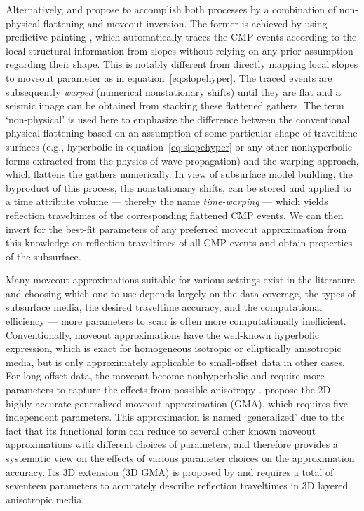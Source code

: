 Alternatively, \cite{will} and \cite{willthesis} propose to accomplish both processes by a combination of non-physical flattening and moveout inversion. The former is achieved by using predictive painting \cite[]{fomelpredict}, which automatically traces the CMP events according to the local structural information from slopes without relying on any prior assumption regarding their shape. This is notably different from directly mapping local slopes to moveout parameter as in equation~\ref{eq:slopehyper}. The traced events are subsequently \textit{warped} (numerical nonstationary shifts) until they are flat and a seismic image can be obtained from stacking these flattened gathers. The term `non-physical' is used here to emphasize the difference between the conventional physical flattening based on an assumption of some particular shape of traveltime surfaces (e.g., hyperbolic in equation~\ref{eq:slopehyper} or any other nonhyperbolic forms extracted from the physics of wave propagation) and the warping approach, which flattens the gathers numerically. In view of subsurface model building, the byproduct of this process, the nonstationary shifts, can be stored and applied to a time attribute volume --- thereby the name \textit{time-warping} --- which yields reflection traveltimes of the corresponding flattened CMP events. We can then invert for the best-fit parameters of any preferred moveout approximation from this knowledge on reflection traveltimes of all CMP events and obtain properties of the subsurface.


Many moveout approximations suitable for various settings exist in the literature and choosing which one to use depends largely on the data coverage, the types of subsurface media, the desired traveltime accuracy, and the computational efficiency --- more parameters to scan is often more computationally inefficient. Conventionally, moveout approximations have the well-known hyperbolic expression, which is exact for homogeneous isotropic or elliptically anisotropic media, but is only approximately applicable to small-offset data in other cases. For long-offset data, the moveout become nonhyperbolic and require more parameters to capture the effects from possible anisotropy \cite[]{hake,castle,tsvankinthomsen1994,alkatsvankin,alortho,ursin,blias2009,aleixo,alkascan,golikov,farra,fpj}. \cite{fomelstovas} propose the 2D highly accurate generalized moveout approximation (GMA), which requires five independent parameters. This approximation is named `generalized' due to the fact that its functional form can reduce to several other known moveout approximations with different choices of parameters, and therefore provides a systematic view on the effects of various parameter choices on the approximation accuracy. Its 3D extension (3D GMA) is proposed by \cite{zonegma} and requires a total of seventeen parameters to accurately describe reflection traveltimes in 3D layered anisotropic media.

